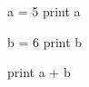 \documentclass[a4paper,12pt]{book}
\begin{document}

\pytexStart[main]

\begin{pytex}
  a = 5
  print a
\end{pytex}

\begin{pytex}
  b = 6
  print b
\end{pytex}

\begin{pytex}
  print a + b
\end{pytex}
\end{document}
